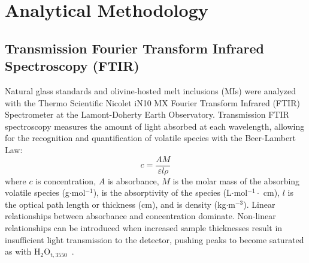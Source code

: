 \documentclass[draft]{agujournal2019}
\begin{document}
\section{Analytical Methodology} %
\subsection{Transmission Fourier Transform Infrared Spectroscopy (FTIR)}
Natural glass standards and olivine-hosted melt inclusions (MIs) were analyzed with the Thermo Scientific Nicolet iN10 MX Fourier Transform Infrared (FTIR) Spectrometer at the Lamont-Doherty Earth Observatory. Transmission FTIR spectroscopy measures the amount of light absorbed at each wavelength, allowing for the recognition and quantification of volatile species with the Beer-Lambert Law: 
\begin{equation}
c = \frac{A M}{\varepsilon l \rho}
\end{equation}
where $c$ is concentration, $A$ is absorbance, $M$ is the molar mass of the absorbing volatile species (g$\cdot$mol$^{-1}$), \textepsilon{} is the absorptivity of the species (L$\cdot$mol$^{-1}\cdot$ cm), $l$ is the optical path length or thickness (cm), and \textrho{} is density (kg$\cdot$m$^{-3}$). Linear relationships between absorbance and concentration dominate. Non-linear relationships can be introduced when increased sample thicknesses result in insufficient light transmission to the detector, pushing peaks to become saturated as with ${\mathrm{H_2O_{t, 3550}}}$~\cite{McIntoshetal2017, vonAulocketal2014}. 
\end{document}
